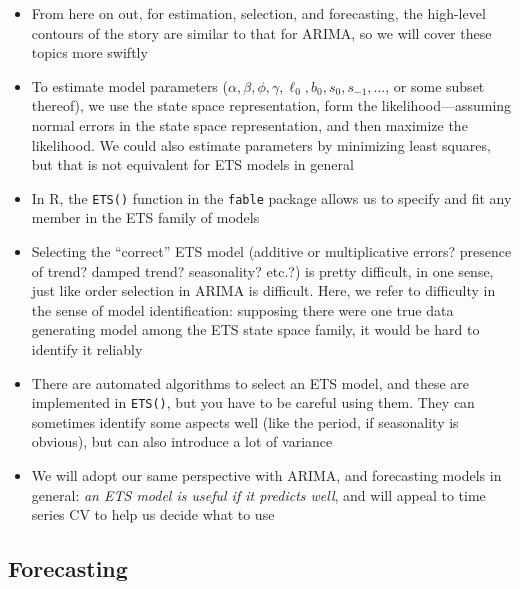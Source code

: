 \documentclass{article}
\begin{document}
\begin{itemize}
\item From here on out, for estimation, selection, and forecasting, the
  high-level contours of the story are similar to that for ARIMA, so we will
  cover these topics more swiftly 

\item To estimate model parameters
  ($\alpha,\beta,\phi,\gamma,\ell_0,b_0,s_0,s_{-1},\dots$, or some subset
  thereof), we use the state space representation, form the
  likelihood---assuming normal errors in the state space representation, and
  then maximize the likelihood. We could also estimate parameters by minimizing
  least squares, but that is not equivalent for ETS models in general 

\item In R, the \verb|ETS()| function in the \verb|fable| package allows us to
  specify and fit any member in the ETS family of models

\item Selecting the ``correct'' ETS model (additive or multiplicative errors?
  presence of trend? damped trend? seasonality? etc.?) is pretty difficult, in
  one sense, just like order selection in ARIMA is difficult. Here, we refer to
  difficulty in the sense of model identification: supposing there were one true
  data generating model among the ETS state space family, it would be hard to
  identify it reliably  

\item There are automated algorithms to select an ETS model, and these are
  implemented in \verb|ETS()|, but you have to be careful using them. They can
  sometimes identify some aspects well (like the period, if seasonality is
  obvious), but can also introduce a lot of variance 

\item We will adopt our same perspective with ARIMA, and forecasting models in
  general: \emph{an ETS model is useful if it predicts well}, and will appeal to
  time series CV to help us decide what to use 
\end{itemize}

\subsection{Forecasting}
\end{document}
